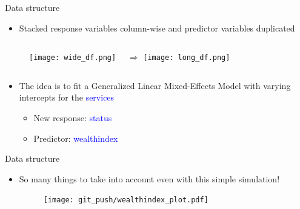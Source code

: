\documentclass{beamer}
\begin{document}
\begin{frame}{Data structure}

\begin{itemize}[<+->]
\item Stacked response variables column-wise and predictor variables duplicated
\end{itemize}
\vspace{-1cm}
\begin{block}{}
\begin{figure}[H]
\centering
\begin{columns}[t]
\texttt{[image: wide\_df.png]}
\pause
{}
$\quad\Longrightarrow$
\pause
{}
\texttt{[image: long\_df.png]}
\end{columns}
\end{figure}
\vspace{-1cm}
\begin{itemize}[<+->]
\item The idea is to fit a Generalized Linear Mixed-Effects Model with varying intercepts for the \textcolor{blue}{services}

\begin{itemize}[<+->]
\item New response: \textcolor{blue}{status}
\item Predictor: \textcolor{blue}{wealthindex}
\end{itemize}
\end{itemize}
\end{block}
\end{frame}

\begin{frame}{Data structure}
\begin{itemize}[<+->]
\item So many things to take into account even with this simple simulation!
\pause
\begin{figure}[H]
\centering
\texttt{[image: git\_push/wealthindex\_plot.pdf]}
\end{figure}
\end{itemize}
\end{frame}
\end{document}
